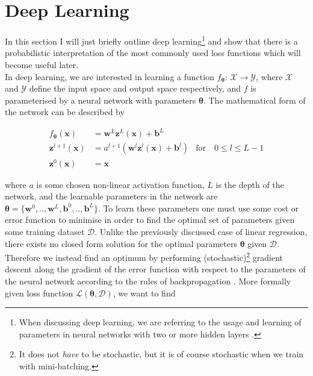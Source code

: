 


\section{Deep Learning}
\label{sec:deeplearning}

 In this section I will just briefly outline deep learning\footnote{When discussing deep learning, we are referring to the usage and learning of parameters in neural networks with two or more hidden layers \citep{Goodfellow-et-al-2016}.} and show that there is a probabilistic interpretation of the most commonly used loss functions which will become useful later.\\
 
\noindent In deep learning, we are interested in learning a function $f_{\bm{\theta}}$: $\mathcal{X}\rightarrow\mathcal{Y}$, where $\mathcal{X}$ and $\mathcal{Y}$ define the input space and output space respectively, and $f$ is parameterised by a neural network with parameters $\bm{\theta}$. The mathematical form of the network can be described by

\begin{align}
    f_{\bm{\theta}}(\mathbf{x}) & = \mathbf{w}^L\mathbf{z}^L(\mathbf{x})+\mathbf{b}^L& \\
    \mathbf{z}^{l+1}(\mathbf{x}) & = a^{l+1}(\mathbf{w}^l\mathbf{z}^{l}(\mathbf{x})+\mathbf{b}^{l}) & \text{for} \quad 0 \leq l \leq L-1\\
    \mathbf{z}^0(\mathbf{x}) & = \mathbf{x}
\end{align}

\noindent where $a$ is some chosen non-linear activation function, $L$ is the depth of the network, and the learnable parameters in the network are $\bm{\theta}=\{\mathbf{w}^0, .., \mathbf{w}^L, \mathbf{b}^0, .., \mathbf{b}^L \}$. To learn these parameters one must use some cost or error function to minimise in order to find the optimal set of parameters given some training dataset $\mathcal{D}$. Unlike the previously discussed case of linear regression, there exists no closed form solution for the optimal parameters $\bm{\theta}$ given $\mathcal{D}$. Therefore we instead find an optimum by performing (stochastic)\footnote{It does not \textit{have} to be stochastic, but it is of course stochastic when we train with mini-batching.} gradient descent along the gradient of the error function with respect to the parameters of the neural network according to the rules of backpropagation \citep{backprop}. More formally given loss function $\mathcal{L}(\bm{\theta}, \mathcal{D})$, we want to find

